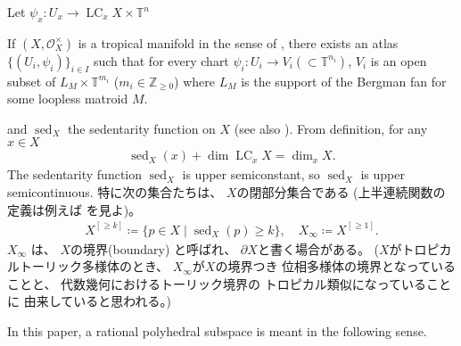 \documentclass[a4paper,dvipdfmx,reqno,12pt]{amsart}
\theoremstyle{definition}
\newcommand{\deq}{\coloneqq}
\newcommand{\opn}[1]{\operatorname{#1}}
\numberwithin{equation}{section}
\begin{document}
Let $\psi_x\colon U_x \to \opn{LC}_x X\times \mathbb{T}^n$

If $(X,\mathcal{O}_X^{\times})$ is a tropical manifold
in the sense of \cite[Definition 6.1]{gross2019sheaftheoretic},
there exists an atlas $\{(U_i,\psi_i)\}_{i\in I}$
such that for every chart $\psi_i \colon U_i \to V_i 
(\subset \mathbb{T}^{n_i})$,
$V_i$ is an open subset of $L_M\times \mathbb{T}^{m_i}$
($m_i\in \mathbb{Z}_{\geq 0}$) where 
$L_M$ is the support of
the Bergman fan for some loopless matroid $M$.


and $\opn{sed}_X$ the sedentarity function on $X$
\cite[Definition 7.2.6]{mikhalkin2018tropical}
(see also \cite[Definition 2.4]{demedrano2023chern}).
From definition, for any $x\in X$
\begin{align}
\opn{sed}_X(x)+\dim \opn{LC}_x X=\dim_x X.
\end{align}
The sedentarity function
$\opn{sed}_X$ is upper semiconstant, so 
$\opn{sed}_X$ is upper semicontinuous.
特に次の集合たちは、
$X$の閉部分集合である
(上半連続関数の定義は例えば\cite[p.287]{MR463157}
を見よ)。
\begin{align}
X^{[\geq k]}\deq \{p\in X\mid \opn{sed}_X(p)\geq k\},
\quad 
X_{\infty}\deq X^{[\geq 1]}.
\end{align}
$X_{\infty}$ は、
$X$の境界(boundary)
と呼ばれ、
$\partial X$と書く場合がある。
($X$がトロピカルトーリック多様体のとき、
$X_{\infty}$が$X$の境界つき
位相多様体の境界となっていることと、
代数幾何におけるトーリック境界の
トロピカル類似になっていることに
由来していると思われる。)

In this paper, a rational polyhedral subspace is meant
in the following sense.
\end{document}

